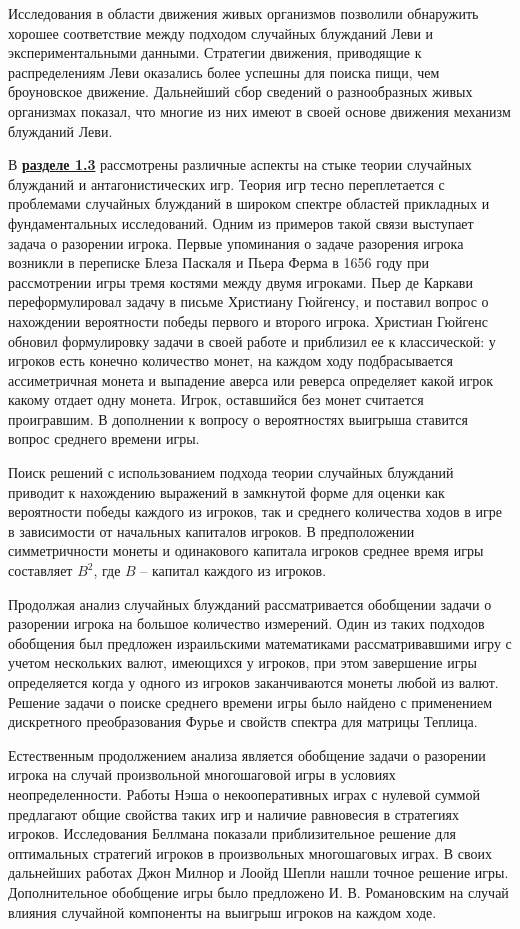 Исследования в области движения живых организмов позволили обнаружить хорошее соответствие между подходом случайных блужданий Леви и экспериментальными данными. Стратегии движения, приводящие к распределениям Леви оказались более успешны для поиска пищи, чем броуновское движение. Дальнейший сбор сведений о разнообразных живых организмах показал, что многие из них имеют в своей основе движения механизм блужданий Леви.

В \underline{\textbf{разделе 1.3}} рассмотрены различные аспекты на стыке теории случайных блужданий и антагонистических игр. Теория игр тесно переплетается с проблемами случайных блужданий в широком спектре областей прикладных и фундаментальных исследований. Одним из примеров такой связи выступает задача о разорении игрока. Первые упоминания о задаче разорения игрока возникли в переписке Блеза Паскаля и Пьера Ферма в 1656 году при рассмотрении игры тремя костями между двумя игроками. Пьер де Каркави переформулировал задачу в письме Христиану Гюйгенсу, и поставил вопрос о нахождении вероятности победы первого и второго игрока. Христиан Гюйгенс обновил формулировку задачи в своей работе и приблизил ее к классической: у игроков есть конечно количество монет, на каждом ходу подбрасывается ассиметричная монета и выпадение аверса или реверса определяет какой игрок какому отдает одну монета. Игрок, оставшийся без монет считается проигравшим. В дополнении к вопросу о вероятностях выигрыша ставится вопрос среднего времени игры.

Поиск решений с использованием подхода теории случайных блужданий приводит к нахождению выражений в замкнутой форме для оценки как вероятности победы каждого из игроков, так и среднего количества ходов в игре в зависимости от начальных капиталов игроков. В предположении симметричности монеты и одинакового капитала игроков среднее время игры составляет $B^2$, где $B$ -- капитал каждого из игроков.

Продолжая анализ случайных блужданий рассматривается обобщении задачи о разорении игрока на большое количество измерений. Один из таких подходов обобщения был предложен израильскими математиками рассматривавшими игру с учетом нескольких валют, имеющихся у игроков, при этом завершение игры определяется когда у одного из игроков заканчиваются монеты любой из валют. Решение задачи о поиске среднего времени игры было найдено с применением дискретного преобразования Фурье и свойств спектра для матрицы Теплица. 

Естественным продолжением анализа является обобщение задачи о разорении игрока на случай произвольной многошаговой игры в условиях неопределенности. Работы Нэша о некооперативных играх с нулевой суммой предлагают общие свойства таких игр и наличие равновесия в стратегиях игроков. Исследования Беллмана показали приблизительное решение для оптимальных стратегий игроков в произвольных многошаговых играх. В своих дальнейших работах Джон Милнор и Лоойд Шепли нашли точное решение игры. Дополнительное обобщение игры было предложено И. В. Романовским на случай влияния случайной компоненты на выигрыш игроков на каждом ходе. 

